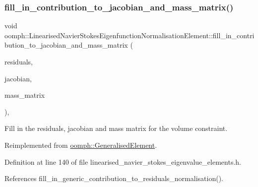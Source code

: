 \subsubsection{\texorpdfstring{fill\+\_\+in\+\_\+contribution\+\_\+to\+\_\+jacobian\+\_\+and\+\_\+mass\+\_\+matrix()}{fill\_in\_contribution\_to\_jacobian\_and\_mass\_matrix()}}
{\footnotesize\ttfamily void oomph\+::\+Linearised\+Navier\+Stokes\+Eigenfunction\+Normalisation\+Element\+::fill\+\_\+in\+\_\+contribution\+\_\+to\+\_\+jacobian\+\_\+and\+\_\+mass\+\_\+matrix (\begin{DoxyParamCaption}\item[{\hyperlink{classoomph_1_1Vector}{Vector}$<$ double $>$ \&}]{residuals,  }\item[{\hyperlink{classoomph_1_1DenseMatrix}{Dense\+Matrix}$<$ double $>$ \&}]{jacobian,  }\item[{\hyperlink{classoomph_1_1DenseMatrix}{Dense\+Matrix}$<$ double $>$ \&}]{mass\+\_\+matrix }\end{DoxyParamCaption})\hspace{0.3cm}{\ttfamily [inline]}, {\ttfamily [virtual]}}



Fill in the residuals, jacobian and mass matrix for the volume constraint. 



Reimplemented from \hyperlink{classoomph_1_1GeneralisedElement_a2b6294a730647cf865da94f2531466f8}{oomph\+::\+Generalised\+Element}.



Definition at line 140 of file linearised\+\_\+navier\+\_\+stokes\+\_\+eigenvalue\+\_\+elements.\+h.



References fill\+\_\+in\+\_\+generic\+\_\+contribution\+\_\+to\+\_\+residuals\+\_\+normalisation().

\mbox{\label{classoomph_1_1LinearisedNavierStokesEigenfunctionNormalisationElement_abc4ee2562952463b2a165779d84b4db9}} 
